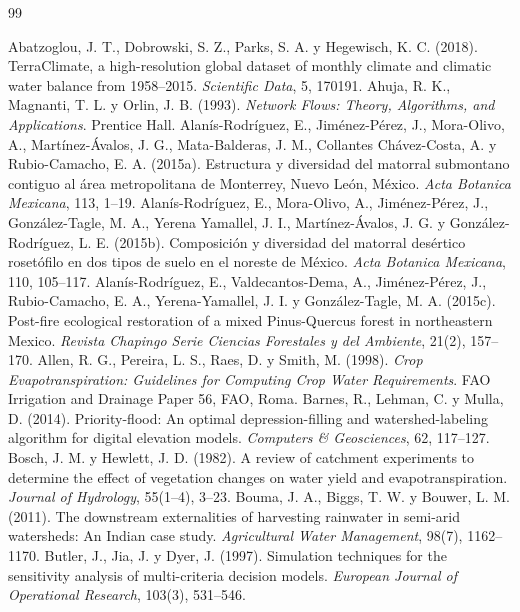 \begin{thebibliography}{99}
 Abatzoglou, J. T., Dobrowski, S. Z., Parks, S. A. y Hegewisch, K. C. (2018). TerraClimate, a high-resolution global dataset of monthly climate and climatic water balance from 1958–2015. \emph{Scientific Data}, 5, 170191.
 Ahuja, R. K., Magnanti, T. L. y Orlin, J. B. (1993). \emph{Network Flows: Theory, Algorithms, and Applications}. Prentice Hall.
 Alanís-Rodríguez, E., Jiménez-Pérez, J., Mora-Olivo, A., Martínez-Ávalos, J. G., Mata-Balderas, J. M., Collantes Chávez-Costa, A. y Rubio-Camacho, E. A. (2015a). Estructura y diversidad del matorral submontano contiguo al área metropolitana de Monterrey, Nuevo León, México. \emph{Acta Botanica Mexicana}, 113, 1–19.
 Alanís-Rodríguez, E., Mora-Olivo, A., Jiménez-Pérez, J., González-Tagle, M. A., Yerena Yamallel, J. I., Martínez-Ávalos, J. G. y González-Rodríguez, L. E. (2015b). Composición y diversidad del matorral desértico rosetófilo en dos tipos de suelo en el noreste de México. \emph{Acta Botanica Mexicana}, 110, 105–117.
 Alanís-Rodríguez, E., Valdecantos-Dema, A., Jiménez-Pérez, J., Rubio-Camacho, E. A., Yerena-Yamallel, J. I. y González-Tagle, M. A. (2015c). Post-fire ecological restoration of a mixed Pinus-Quercus forest in northeastern Mexico. \emph{Revista Chapingo Serie Ciencias Forestales y del Ambiente}, 21(2), 157–170.
 Allen, R. G., Pereira, L. S., Raes, D. y Smith, M. (1998). \emph{Crop Evapotranspiration: Guidelines for Computing Crop Water Requirements}. FAO Irrigation and Drainage Paper 56, FAO, Roma.
 Barnes, R., Lehman, C. y Mulla, D. (2014). Priority-flood: An optimal depression-filling and watershed-labeling algorithm for digital elevation models. \emph{Computers \& Geosciences}, 62, 117–127.
 Bosch, J. M. y Hewlett, J. D. (1982). A review of catchment experiments to determine the effect of vegetation changes on water yield and evapotranspiration. \emph{Journal of Hydrology}, 55(1–4), 3–23.
 Bouma, J. A., Biggs, T. W. y Bouwer, L. M. (2011). The downstream externalities of harvesting rainwater in semi-arid watersheds: An Indian case study. \emph{Agricultural Water Management}, 98(7), 1162–1170.
 Butler, J., Jia, J. y Dyer, J. (1997). Simulation techniques for the sensitivity analysis of multi-criteria decision models. \emph{European Journal of Operational Research}, 103(3), 531–546.

\end{thebibliography}
